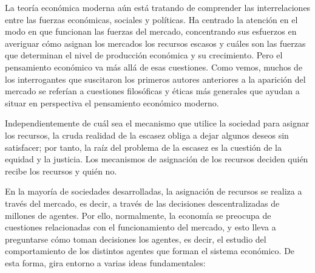 \documentclass[10pt,a4paper]{article}
\begin{document}
{La teoría económica moderna aún está tratando de comprender las interrelaciones entre las fuerzas económicas, sociales y políticas. Ha centrado la atención en el modo en que funcionan las fuerzas del mercado, concentrando sus esfuerzos en averiguar cómo asignan los mercados los recursos escasos y cuáles son las fuerzas que determinan el nivel de producción económica y su crecimiento. Pero el pensamiento económico va más allá de esas cuestiones. Como vemos, muchos de los interrogantes que suscitaron los primeros autores anteriores a la aparición del mercado se referían a cuestiones filosóficas y éticas más generales que ayudan a situar en perspectiva el pensamiento económico moderno.

Independientemente de cuál sea el mecanismo que utilice la sociedad para asignar los recursos, la cruda realidad de la escasez obliga a dejar algunos deseos sin satisfacer; por tanto, la raíz del problema de la escasez es la cuestión de la equidad y la justicia. Los mecanismos de asignación de los recursos deciden quién recibe los recursos y quién no.
} En la mayoría de sociedades desarrolladas, la asignación de recursos se realiza a través del mercado, es decir, a través de las decisiones descentralizadas de millones de agentes. Por ello, normalmente, la economía se preocupa de cuestiones relacionadas con el funcionamiento del mercado, y esto lleva a preguntarse cómo toman decisiones los agentes, es decir, el estudio del comportamiento de los distintos agentes que forman el sistema económico. De esta forma, gira entorno a varias ideas fundamentales:
\end{document}
